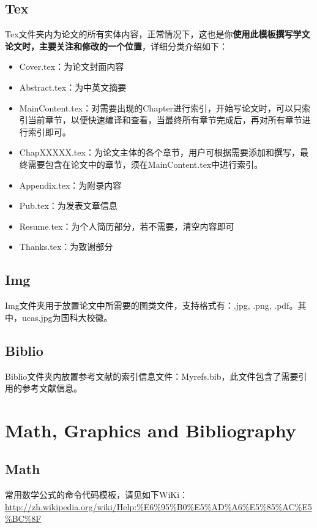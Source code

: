 \subsection{Tex}

Tex文件夹内为论文的所有实体内容，正常情况下，这也是你\textbf{使用此模板撰写学文论文时，主要关注和修改的一个位置}，详细分类介绍如下：

\begin{itemize}
  \item Cover.tex：为论文封面内容
  \item Abstract.tex：为中英文摘要
  \item Main\textunderscore Content.tex：对需要出现的Chapter进行索引，开始写论文时，可以只索引当前章节，以便快速编译和查看，当最终所有章节完成后，再对所有章节进行索引即可。
  \item Chap\textunderscore XXXXX.tex：为论文主体的各个章节，用户可根据需要添加和撰写，最终需要包含在论文中的章节，须在Main\textunderscore Content.tex中进行索引。
  \item Appendix.tex：为附录内容
  \item Pub.tex：为发表文章信息
  \item Resume.tex：为个人简历部分，若不需要，清空内容即可
  \item Thanks.tex：为致谢部分
\end{itemize}

\subsection{Img}

Img文件夹用于放置论文中所需要的图类文件，支持格式有：.jpg, .png, .pdf。其中，ucas.jpg为国科大校徽。

\subsection{Biblio}

Biblio文件夹内放置参考文献的索引信息文件：Myrefs.bib，此文件包含了需要引用的参考文献信息。

\section{Math, Graphics and Bibliography}

\subsection{Math}

常用数学公式的命令代码模板，请见如下WiKi：\url{http://zh.wikipedia.org/wiki/Help:%E6%95%B0%E5%AD%A6%E5%85%AC%E5%BC%8F}

